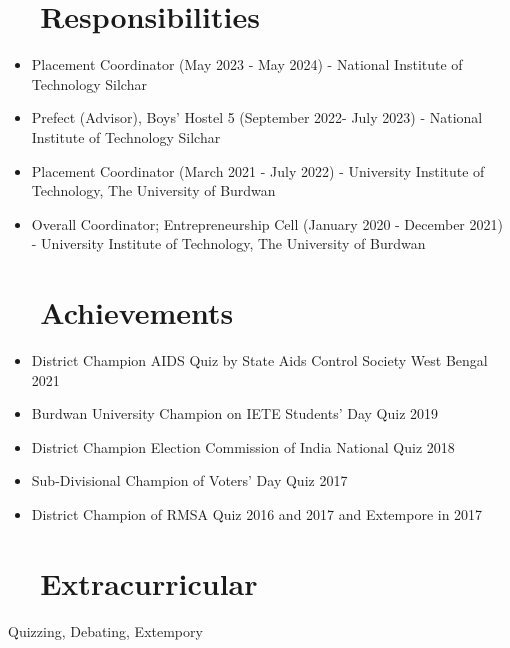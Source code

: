 \documentclass[a4paper,20pt]{article}
\begin{document}
\section{~~\textbf{Responsibilities}}
\begin{itemize}
\item{Placement Coordinator (May 2023 - May 2024) - National Institute of Technology Silchar}
\item{Prefect (Advisor), Boys’ Hostel 5 (September 2022- July 2023) - National Institute of Technology Silchar}
\item{Placement Coordinator (March 2021 - July 2022) - University Institute of Technology, The University of Burdwan}
\item{Overall Coordinator; Entrepreneurship Cell (January 2020 - December 2021) - University Institute of Technology, The University of Burdwan}
\end{itemize}

\section{~~\textbf{Achievements}}
\begin{itemize}
    \item {District Champion AIDS Quiz by State Aids Control Society West Bengal 2021} 
    \item {Burdwan University Champion on IETE Students’ Day Quiz 2019}
    \item {District Champion Election Commission of India National Quiz 2018}
    \item {Sub-Divisional Champion of Voters’ Day Quiz 2017}
    \item {District Champion of RMSA Quiz 2016 and 2017 and Extempore in 2017}
\end{itemize}

\section{~~\textbf{Extracurricular}}
\begin{description}
\item {Quizzing, Debating, Extempory}
\end{description}
\end{document}
